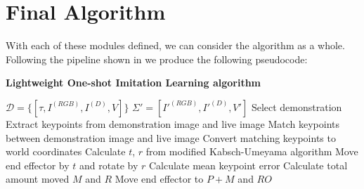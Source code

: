 
\section{Final Algorithm}
With each of these modules defined, we can consider the algorithm as a whole. Following the pipeline shown in  we produce the following pseudocode:

\begin{algorithm}
    \setlength{\baselineskip}{18pt}
    \caption{\textbf{Lightweight One-shot Imitation Learning algorithm}}
    \label{alg:whole-system}
    \begin{algorithmic}[1]
        \Require $\mathcal{D} = \{[\tau, I^{(RGB)}, I^{(D)}, V]\}$ 
        \Statex $\Sigma' = [I'^{(RGB)}, I'^{(D)}, V']$ 
        \State Select demonstration
        \Repeat
            \State Extract keypoints from demonstration image and live image
            \State Match keypoints between demonstration image and live image
            \State Convert matching keypoints to world coordinates
            \State Calculate $t$, $r$ from modified Kabsch-Umeyama algorithm
            \State Move end effector by $t$ and rotate by $r$
            \State Calculate mean keypoint error
        \State Calculate total amount moved $M$ and $R$
            \State Move end effector to $P+M$ and $RO$
        \EndFor
        
    \end{algorithmic}
\end{algorithm}



